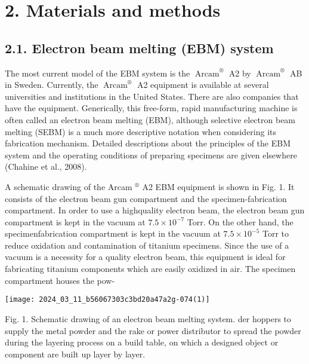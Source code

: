 \documentclass[10pt]{article}
\begin{document}
\section*{2. Materials and methods}
\subsection*{2.1. Electron beam melting (EBM) system}
The most current model of the EBM system is the $\operatorname{Arcam}^{\circledR}$ A2 by $\operatorname{Arcam}^{\circledR}$ AB in Sweden. Currently, the $\operatorname{Arcam}^{\circledR}$ A2 equipment is available at several universities and institutions in the United States. There are also companies that have the equipment. Generically, this free-form, rapid manufacturing machine is often called an electron beam melting (EBM), although selective electron beam melting (SEBM) is a much more descriptive notation when considering its fabrication mechanism. Detailed descriptions about the principles of the EBM system and the operating conditions of preparing specimens are given elsewhere (Chahine et al., 2008).

A schematic drawing of the Arcam ${ }^{\circledR}$ A2 EBM equipment is shown in Fig. 1. It consists of the electron beam gun compartment and the specimen-fabrication compartment. In order to use a highquality electron beam, the electron beam gun compartment is kept in the vacuum at $7.5 \times 10^{-7}$ Torr. On the other hand, the specimenfabrication compartment is kept in the vacuum at $7.5 \times 10^{-5}$ Torr to reduce oxidation and contamination of titanium specimens. Since the use of a vacuum is a necessity for a quality electron beam, this equipment is ideal for fabricating titanium components which are easily oxidized in air. The specimen compartment houses the pow-

\begin{center}
\texttt{[image: 2024\_03\_11\_b56067303c3bd20a47a2g-074(1)]}
\end{center}

Fig. 1. Schematic drawing of an electron beam melting system. der hoppers to supply the metal powder and the rake or power distributor to spread the powder during the layering process on a build table, on which a designed object or component are built up layer by layer.
\end{document}

